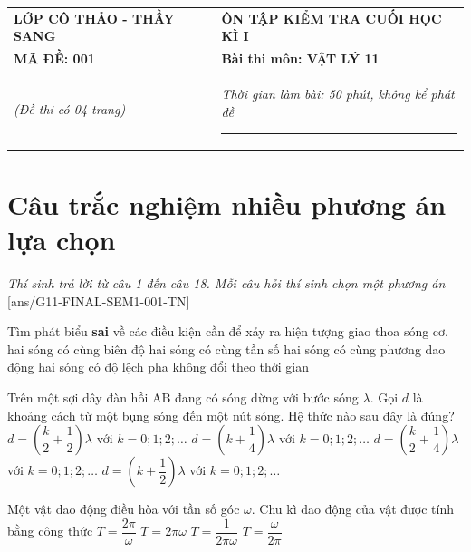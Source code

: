 \begin{center}
	\begin{tabular}{M{9.25cm}M{8.75cm}}
		\textbf{LỚP CÔ THẢO - THẦY SANG}& \textbf{ÔN TẬP KIỂM TRA CUỐI HỌC KÌ I}\\
		\textbf{MÃ ĐỀ: 001}& \textbf{Bài thi môn: VẬT LÝ 11}\\
		\textit{(Đề thi có 04 trang)}& \textit{Thời gian làm bài: 50 phút, không kể phát đề}
		
		\noindent\rule{4cm}{0.8pt} \\
	\end{tabular}
\end{center}
\setcounter{section}{0}
\section{Câu trắc nghiệm nhiều phương án lựa chọn}
\textit{Thí sinh trả lời từ câu 1 đến câu 18. Mỗi câu hỏi thí sinh chọn một phương án}
\setcounter{ex}{0}
[ans/G11-FINAL-SEM1-001-TN]
\begin{ex}
	Tìm phát biểu \textbf{sai} về các điều kiện cần để xảy ra hiện tượng giao thoa sóng cơ. 
	\choice
	{\True hai sóng có cùng biên độ}
	{hai sóng có cùng tần số}
	{hai sóng có cùng phương dao động}
	{hai sóng có độ lệch pha không đổi theo thời gian}
	\loigiai{}
\end{ex}
\begin{ex}
	Trên một sợi dây đàn hồi AB đang có sóng dừng với bước sóng $\lambda$. Gọi $d$ là khoảng cách từ một bụng sóng đến một nút sóng. Hệ thức nào sau đây là đúng? 
	\choice
	{$d=\left(\dfrac{k}{2}+\dfrac{1}{2}\right)\lambda$ với $k=0; 1; 2; \dots$}
	{$d=\left(k+\dfrac{1}{4}\right)\lambda$ với $k=0; 1; 2; \dots$}
	{\True $d=\left(\dfrac{k}{2}+\dfrac{1}{4}\right)\lambda$ với $k=0; 1; 2; \dots$}
	{$d=\left(k+\dfrac{1}{2}\right)\lambda$ với $k=0; 1; 2; \dots$}
\end{ex}
\begin{ex}
	Một vật dao động điều hòa với tần số góc $\omega$. Chu kì dao động của vật được tính bằng công thức
	\choice
	{\True $T=\dfrac{2\pi}{\omega}$}
	{$T=2\pi \omega$}
	{$T=\dfrac{1}{2\pi \omega}$}
	{$T=\dfrac{\omega}{2\pi}$}
	\loigiai{}
\end{ex}
